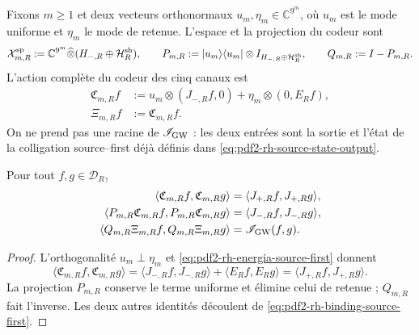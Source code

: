 Fixons \(m\geq1\) et deux vecteurs orthonormaux
\(u_m,\eta_m\in\mathbb C^{9^m}\), où \(u_m\) est le mode uniforme et
\(\eta_m\) le mode de retenue. L'espace et la projection du codeur sont
\begin{equation}\label{eq:pdf2-rh-hilbert-comun}
 \mathcal X_{m,R}^{\rm sp}
 :=\mathbb C^{9^m}\widehat\otimes
   (H_{-,R}\oplus\mathcal H_R^{\rm sh}),
 \qquad
 P_{m,R}:=|u_m\rangle\langle u_m|\otimes
 I_{H_{-,R}\oplus\mathcal H_R^{\rm sh}},
 \qquad Q_{m,R}:=I-P_{m,R}.
\end{equation}
L'action complète du codeur des cinq canaux est
\begin{equation}\label{eq:pdf2-rh-xi-comun-explicita}
 \boxed{
 \begin{aligned}
  \mathfrak C_{m,R}f
  &:=u_m\otimes(J_{-,R}f,0)
    +\eta_m\otimes(0,E_Rf),\\
  \Xi_{m,R}f&:=\mathfrak C_{m,R}f.
 \end{aligned}}
\end{equation}
On ne prend pas une racine de \(\mathscr I_{\rm GW}\) : les deux entrées sont la
sortie et l'état de la colligation source--first déjà définis dans
\eqref{eq:pdf2-rh-source-state-output}.

\begin{proposition}
\label{prop:pdf2-rh-vmas-isometria}
Pour tout \(f,g\in\mathcal D_R\),
\begin{equation}\label{eq:pdf2-rh-dos-momentos-construidos}
\begin{aligned}
 \langle\mathfrak C_{m,R}f,\mathfrak C_{m,R}g\rangle
  &=\langle J_{+,R}f,J_{+,R}g\rangle,\\
 \langle P_{m,R}\mathfrak C_{m,R}f,
         P_{m,R}\mathfrak C_{m,R}g\rangle
  &=\langle J_{-,R}f,J_{-,R}g\rangle,\\
 \langle Q_{m,R}\Xi_{m,R}f,Q_{m,R}\Xi_{m,R}g\rangle
  &=\mathscr I_{\rm GW}(f,g).
\end{aligned}
\end{equation}
\end{proposition}

\begin{proof}
L'orthogonalité \(u_m\perp\eta_m\) et
\eqref{eq:pdf2-rh-energia-source-first} donnent
\[
 \langle\mathfrak C_{m,R}f,\mathfrak C_{m,R}g\rangle
 =\langle J_{-,R}f,J_{-,R}g\rangle
  +\langle E_Rf,E_Rg\rangle
 =\langle J_{+,R}f,J_{+,R}g\rangle.
\]
La projection \(P_{m,R}\) conserve le terme uniforme et élimine celui de
retenue ; \(Q_{m,R}\) fait l'inverse. Les deux autres identités découlent de
\eqref{eq:pdf2-rh-binding-source-first}.
\end{proof}

